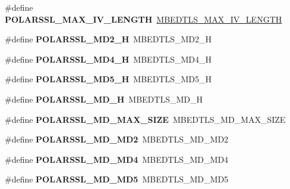 \begin{DoxyCompactItemize}
\item 
\mbox{\label{compat-1_83_8h_aded691b9d905920d9675e7b9828a237c}} 
\#define {\bfseries P\+O\+L\+A\+R\+S\+S\+L\+\_\+\+M\+A\+X\+\_\+\+I\+V\+\_\+\+L\+E\+N\+G\+TH}~\mbox{\hyperlink{cipher_8h_aec294721b811aa0f7dcc940029fd8aab}{M\+B\+E\+D\+T\+L\+S\+\_\+\+M\+A\+X\+\_\+\+I\+V\+\_\+\+L\+E\+N\+G\+TH}}
\item 
\mbox{\label{compat-1_83_8h_a18d9b6cf073a4f231468ca702deddff8}} 
\#define {\bfseries P\+O\+L\+A\+R\+S\+S\+L\+\_\+\+M\+D2\+\_\+H}~M\+B\+E\+D\+T\+L\+S\+\_\+\+M\+D2\+\_\+H
\item 
\mbox{\label{compat-1_83_8h_a966bac979ed9d71082e156a8a1f178bb}} 
\#define {\bfseries P\+O\+L\+A\+R\+S\+S\+L\+\_\+\+M\+D4\+\_\+H}~M\+B\+E\+D\+T\+L\+S\+\_\+\+M\+D4\+\_\+H
\item 
\mbox{\label{compat-1_83_8h_ae65ff9309b311d5c29123ee1ddd0febc}} 
\#define {\bfseries P\+O\+L\+A\+R\+S\+S\+L\+\_\+\+M\+D5\+\_\+H}~M\+B\+E\+D\+T\+L\+S\+\_\+\+M\+D5\+\_\+H
\item 
\mbox{\label{compat-1_83_8h_ae291e97d37cfaf6c7bcd01b6d6f4d72c}} 
\#define {\bfseries P\+O\+L\+A\+R\+S\+S\+L\+\_\+\+M\+D\+\_\+H}~M\+B\+E\+D\+T\+L\+S\+\_\+\+M\+D\+\_\+H
\item 
\mbox{\label{compat-1_83_8h_a38c76a15d6a3874f898f3dc60750dde1}} 
\#define {\bfseries P\+O\+L\+A\+R\+S\+S\+L\+\_\+\+M\+D\+\_\+\+M\+A\+X\+\_\+\+S\+I\+ZE}~M\+B\+E\+D\+T\+L\+S\+\_\+\+M\+D\+\_\+\+M\+A\+X\+\_\+\+S\+I\+ZE
\item 
\mbox{\label{compat-1_83_8h_ae52b85cdf44adce4073e3cd8db8d3296}} 
\#define {\bfseries P\+O\+L\+A\+R\+S\+S\+L\+\_\+\+M\+D\+\_\+\+M\+D2}~M\+B\+E\+D\+T\+L\+S\+\_\+\+M\+D\+\_\+\+M\+D2
\item 
\mbox{\label{compat-1_83_8h_ac916a55f1d25aad39063d984832715cd}} 
\#define {\bfseries P\+O\+L\+A\+R\+S\+S\+L\+\_\+\+M\+D\+\_\+\+M\+D4}~M\+B\+E\+D\+T\+L\+S\+\_\+\+M\+D\+\_\+\+M\+D4
\item 
\mbox{\label{compat-1_83_8h_a788b1f9d91a76701eecbfd4e30467b4d}} 
\#define {\bfseries P\+O\+L\+A\+R\+S\+S\+L\+\_\+\+M\+D\+\_\+\+M\+D5}~M\+B\+E\+D\+T\+L\+S\+\_\+\+M\+D\+\_\+\+M\+D5

\end{DoxyCompactItemize}
